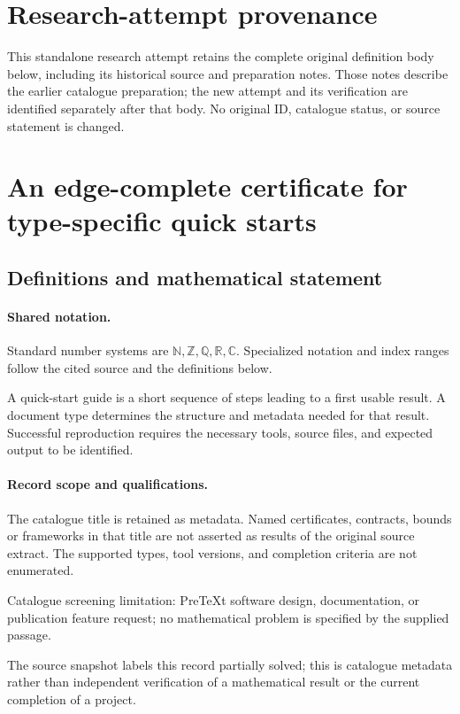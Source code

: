 \documentclass[11pt]{article}
\begin{document}
\section*{Research-attempt provenance}
This standalone research attempt retains the complete original definition body below,
including its historical source and preparation notes. Those notes describe the
earlier catalogue preparation; the new attempt and its verification are identified
separately after that body. No original ID, catalogue status, or source statement is changed.

\section{An edge-complete certificate for type-specific quick starts}\label{statement}

\subsection{Definitions and mathematical statement}

\paragraph{Shared notation.}Standard number systems are $\mathbb N,\mathbb Z,\mathbb Q,\mathbb R,\mathbb C$. Specialized notation and index ranges follow the cited source and the definitions below.


A quick-start guide is a short sequence of steps leading to a first usable result. A document type determines the structure and metadata needed for that result. Successful reproduction requires the necessary tools, source files, and expected output to be identified.
\paragraph{Record scope and qualifications.}
The catalogue title is retained as metadata. Named certificates, contracts, bounds or frameworks in that title are not asserted as results of the original source extract.
The supported types, tool versions, and completion criteria are not enumerated.

Catalogue screening limitation: PreTeXt software design, documentation, or publication feature request; no mathematical problem is specified by the supplied passage.

The source snapshot labels this record partially solved; this is catalogue metadata rather than independent verification of a mathematical result or the current completion of a project.
\end{document}
